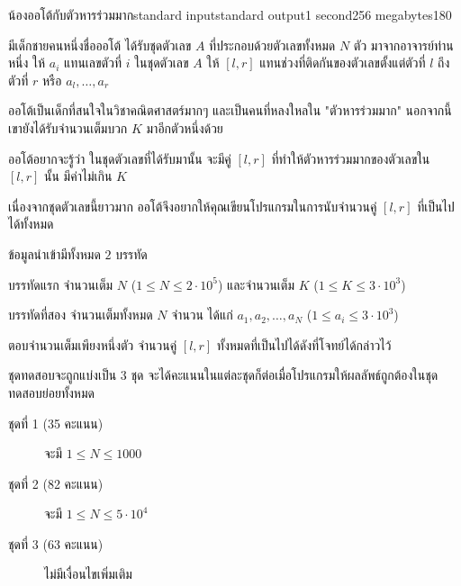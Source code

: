 \documentclass[11pt,a4paper]{article}
\begin{document}
\begin{problem}{น้องออโต้กับตัวหารร่วมมาก}{standard input}{standard output}{1 second}{256 megabytes}{180}

มีเด็กชายคนหนึ่งชื่อออโต้ ได้รับชุดตัวเลข $A$ ที่ประกอบด้วยตัวเลขทั้งหมด $N$ ตัว มาจากอาจารย์ท่านหนึ่ง ให้ $a_i$  แทนเลขตัวที่ $i$ ในชุดตัวเลข $A$
ให้ $[l, r]$ แทนช่วงที่ติดกันของตัวเลขตั้งแต่ตัวที่ $l$ ถึงตัวที่ $r$ หรือ $a_l, \dots, a_r$

ออโต้เป็นเด็กที่สนใจในวิชาคณิตศาสตร์มากๆ และเป็นคนที่หลงใหลใน "ตัวหารร่วมมาก" นอกจากนี้ เขายังได้รับจำนวนเต็มบวก $K$ มาอีกตัวหนึ่งด้วย

ออโต้อยากจะรู้ว่า ในชุดตัวเลขที่ได้รับมานั้น จะมีคู่ $[l, r]$ ที่ทำให้ตัวหารร่วมมากของตัวเลขใน $[l, r]$ นั้น มีค่าไม่เกิน $K$

เนื่องจากชุดตัวเลขนี้ยาวมาก ออโต้จึงอยากให้คุณเขียนโปรแกรมในการนับจำนวนคู่ $[l, r]$ ที่เป็นไปได้ทั้งหมด

\InputFile
ข้อมูลนำเข้ามีทั้งหมด $2$ บรรทัด

บรรทัดแรก จำนวนเต็ม $N$ ($1 \le N \le 2\cdot10^5$) และจำนวนเต็ม $K$ ($1 \le K \le 3\cdot10^3$)

บรรทัดที่สอง จำนวนเต็มทั้งหมด $N$ จำนวน ได้แก่ $a_1, a_2, \dots, a_N$ ($1 \le a_i \le 3\cdot10^3$)

\OutputFile
ตอบจำนวนเต็มเพียงหนึ่งตัว จำนวนคู่ $[l, r]$ ทั้งหมดที่เป็นไปได้ดังที่โจทย์ได้กล่าวไว้

\Scoring
ชุดทดสอบจะถูกแบ่งเป็น 3 ชุด จะได้คะแนนในแต่ละชุดก็ต่อเมื่อโปรแกรมให้ผลลัพธ์ถูกต้องในชุดทดสอบย่อยทั้งหมด

\begin{description}
\item[ชุดที่ 1 (35 คะแนน)] จะมี $1 \le N \le 1000$

\item[ชุดที่ 2 (82 คะแนน)] จะมี $1 \le N \le 5\cdot10^4$

\item[ชุดที่ 3 (63 คะแนน)] ไม่มีเงื่อนไขเพิ่มเติม
\end{description}

\Examples

\begin{example}
%
%
\end{example}

\end{problem}
\end{document}
